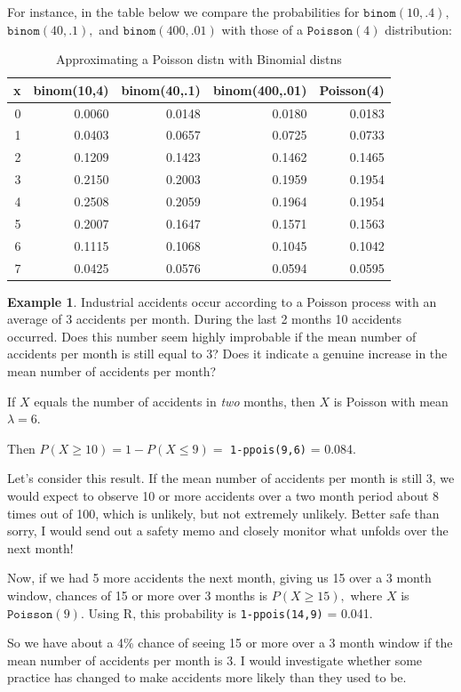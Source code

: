 \documentclass[
]{book}
\theoremstyle{definition}
\theoremstyle{definition}
\newtheorem{example}{Example}[chapter]
\theoremstyle{definition}
\theoremstyle{definition}
\theoremstyle{remark}
\begin{document}
For instance, in the table below we compare the probabilities for \(\texttt{binom}(10,.4),\) \(\texttt{binom}(40,.1),\) and \(\texttt{binom}(400,.01)\) with those of a \(\texttt{Poisson}(4)\) distribution:

\begin{table}
\centering
\caption{\label{tab:plot-pois-binom}Approximating a Poisson distn with Binomial distns}
\centering
\begin{tabular}[t]{r|r|r|r|r}
\hline
x & binom(10,4) & binom(40,.1) & binom(400,.01) & Poisson(4)\\
\hline
0 & 0.0060 & 0.0148 & 0.0180 & 0.0183\\
\hline
1 & 0.0403 & 0.0657 & 0.0725 & 0.0733\\
\hline
2 & 0.1209 & 0.1423 & 0.1462 & 0.1465\\
\hline
3 & 0.2150 & 0.2003 & 0.1959 & 0.1954\\
\hline
4 & 0.2508 & 0.2059 & 0.1964 & 0.1954\\
\hline
5 & 0.2007 & 0.1647 & 0.1571 & 0.1563\\
\hline
6 & 0.1115 & 0.1068 & 0.1045 & 0.1042\\
\hline
7 & 0.0425 & 0.0576 & 0.0594 & 0.0595\\
\hline
\end{tabular}
\end{table}

\begin{example}
\protect\hypertarget{exm:pois-process}{}\label{exm:pois-process}Industrial accidents occur according to a Poisson process with an average of 3 accidents per month. During the last 2 months 10 accidents occurred. Does this number seem highly improbable if the mean number of accidents per month is still equal to 3? Does it indicate a genuine increase in the mean number of accidents per month?

If \(X\) equals the number of accidents in \emph{two} months, then \(X\) is Poisson with mean \(\lambda = 6\).

Then \(P(X \geq 10) = 1 - P(X \leq 9) =\) \texttt{1-ppois(9,6)} = 0.084.

Let's consider this result. If the mean number of accidents per month is still 3, we would expect to observe 10 or more accidents over a two month period about 8 times out of 100, which is unlikely, but not extremely unlikely. Better safe than sorry, I would send out a safety memo and closely monitor what unfolds over the next month!

Now, if we had 5 more accidents the next month, giving us 15 over a 3 month window, chances of 15 or more over 3 months is \(P(X \geq 15),\) where \(X\) is \(\texttt{Poisson}(9)\). Using R, this probability is \texttt{1-ppois(14,9)} = 0.041.

So we have about a 4\% chance of seeing 15 or more over a 3 month window if the mean number of accidents per month is 3. I would investigate whether some practice has changed to make accidents more likely than they used to be.
\end{example}
\end{document}
